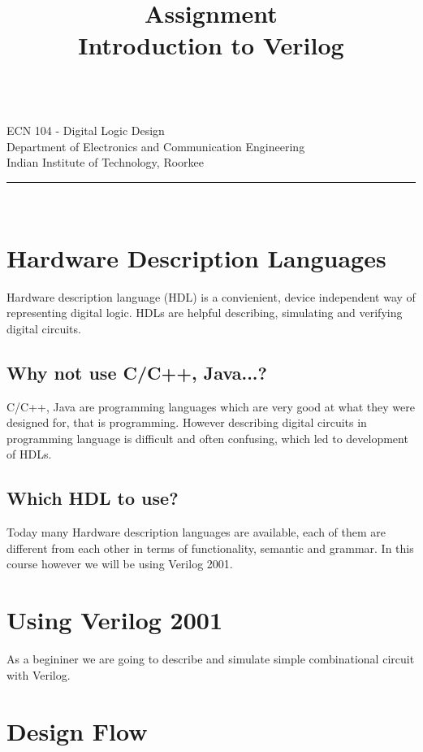 \documentclass[a4paper,10pt]{article}
\makeatletter
\newcommand{\linia}{\rule{\linewidth}{0.5pt}}
\newcommand{\ano}{\text{1}}
\theoremstyle{mytheor}
\renewcommand{\maketitle}{
\begin{center}
\vspace{2ex}
{\huge \textsc{\@title}}
\vspace{1ex}
\\
ECN 104  - Digital Logic Design \\
Department of Electronics and Communication Engineering \\
Indian Institute of Technology, Roorkee
\linia\\
\@author \hfill \@date
\vspace{4ex}
\end{center}
}
\makeatother
\begin{document}
\title{Assignment \ano \\ Introduction to Verilog}

\maketitle

\section*{Hardware Description Languages}
Hardware description language (HDL) is a convienient, device independent way of representing digital logic. HDLs are helpful describing, simulating and verifying digital circuits.

\subsection*{Why not use C/C++, Java...?} 
C/C++, Java are programming languages which are very good at what they were designed for, that is programming. However describing digital circuits in programming language is difficult and often confusing, which led to development of HDLs.

\subsection*{Which HDL to use?}
Today many Hardware description languages are available, each of them are different from each other in terms of functionality, semantic and grammar. In this course however we will be using Verilog  2001.

\section*{Using Verilog 2001}
As a begininer we are going to describe and simulate simple combinational circuit with Verilog.

\section*{Design Flow}  
\end{document}
